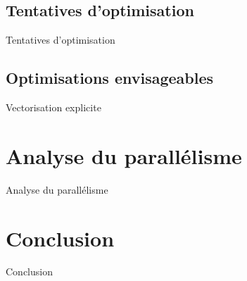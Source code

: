 \documentclass[9.5pt]{beamer}
\begin{document}
	\subsection{Tentatives d'optimisation}
		\begin{frame}{Tentatives d'optimisation}
		\end{frame}

	\subsection{Optimisations envisageables}
		\begin{frame}{Vectorisation explicite}
		\end{frame}

\section{Analyse du parallélisme}
	\begin{frame}{Analyse du parallélisme}
	\end{frame}

\section{Conclusion}
	\begin{frame}{Conclusion}
	\end{frame}
\end{document}
